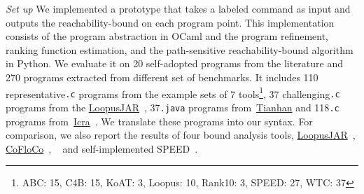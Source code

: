 \emph{Set up} We implemented a prototype {\THESYSTEM} that takes a labeled command as input 
and outputs the reachability-bound on each program point.
This implementation consists of the 
program abstraction in OCaml and the program refinement, ranking function estimation, and the path-sensitive reachability-bound algorithm in Python.
We evaluate it on 20 self-adopted programs from the literature and 270 programs extracted from different set of benchmarks. 
It includes 110 representative{\tt .c} programs from the example sets of 7 tools\footnote{ABC: 15, C4B: 15, KoAT: 3, Loopus: 10, Rank10: 3, SPEED: 27, WTC: 37}, 37 challenging{\tt .c} programs 
from the \hyperlink{https://forsyte.at/static/people/sinn/loopusJAR/index.html}{LoopusJAR}~\cite{BenchmarkLoops,SinnZV17},
37{\tt .java} programs from~\hyperlink{https://zenodo.org/record/5140586\#.Y5pBoC-B1QI}{Tianhan}\cite{BenchmarkTianhan,LuCT21}
and 118{\tt .c} programs from~\hyperlink{https://github.com/icra-team/icra}{Icra}~\cite{BenchmarkIcra,KincaidBCR19,CyphertBKR19}.
We translate these programs into our syntax.
For comparison, we also report the results of four bound analysis tools, 
\hyperlink{https://forsyte.at/software/loopus/}{LoopusJAR}~\cite{SinnZV17},
\hyperlink{https://github.com/aeflores/CoFloCo/tree/master/src}{CoFloCo}~\cite{ToolCofloco,Montoya17,Flores-Montoya16,Flores-MontoyaH14},
~\cite{BenchmarkTianhan}
and self-implemented SPEED~\cite{GulwaniJK09}.

